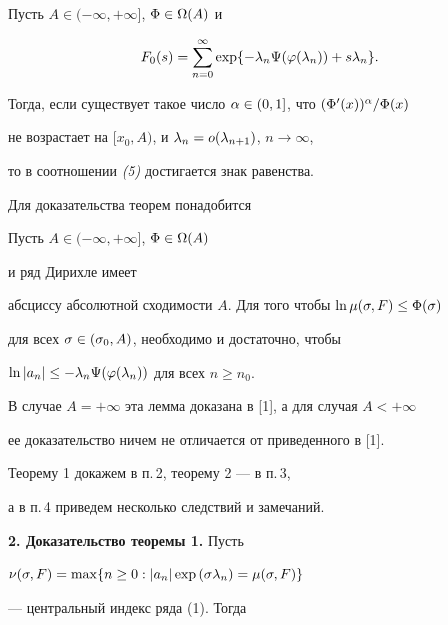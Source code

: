 \begin{thm} Пусть $A\in(-\infty,+\infty]$, $\Phi\in\Omega(A)$ и


$$


F_0(s)=\sum_{n=0}^{\infty}\exp\{-\la_n\F(\p(\la_n))+s\la_n\}.


$$


Тогда, если существует такое число $\alpha\in(0,1]$, что $(\Phi'(x))^{\alpha}/\Phi(x)$


не возрастает на $[x_0,A)$, и $\lambda_n=o(\lambda_{n+1})$, $n\to\infty$,


то в соотношении {\em (5)} достигается знак равенства. 


\end{thm}





Для доказательства теорем понадобится





\begin{lemnonum} Пусть $A\in(-\infty,+\infty]$, $\Phi\in\Omega(A)$


и ряд Дирихле имеет


абсциссу абсолютной сходимости $A$. Для того чтобы $\ln\mu(\sigma,F)\le\Phi(\sigma)$


для всех $\sigma\in(\sigma_0,A)$, необходимо и достаточно, чтобы


$\ln|a_n|\le -\lambda_n\Psi(\varphi(\lambda_n))$ для всех $n\ge n_0$.


\end{lemnonum}





В случае $A=+\infty$ эта лемма доказана в [1], а для случая $A<+\infty$


ее доказательство ничем не отличается от приведенного в [1].





Теорему 1 докажем в п.\,2, теорему 2 --- в п.\,3,


а в п.\,4 приведем несколько следствий и замечаний.


\medskip





{\bf 2. Доказательство теоремы 1.} Пусть


$\nu(\sigma,F)=\max\{n\ge0:|a_n|\exp{(\sigma\lambda_n)}=\mu(\sigma,F)\}$


--- центральный индекс ряда (1). Тогда


$$


